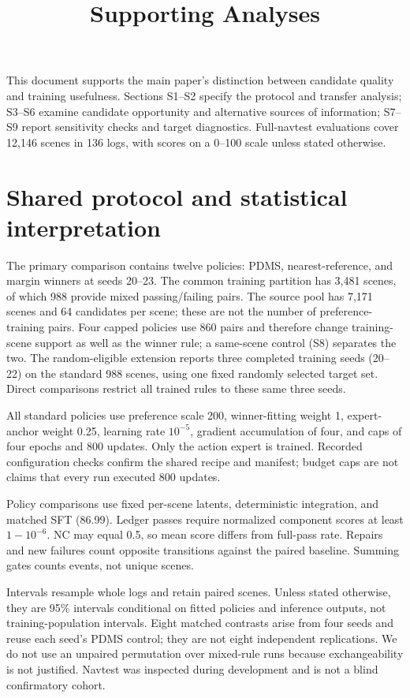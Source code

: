 \documentclass[10pt,letterpaper]{article}
\title{Supporting Analyses}
\date{}
\begin{document}
\maketitle
\noindent This document supports the main paper's distinction between candidate quality and training usefulness. Sections S1--S2 specify the protocol and transfer analysis; S3--S6 examine candidate opportunity and alternative sources of information; S7--S9 report sensitivity checks and target diagnostics. Full-navtest evaluations cover 12,146 scenes in 136 logs, with scores on a 0--100 scale unless stated otherwise. 

\FloatBarrier
\section{Shared protocol and statistical interpretation}
The primary comparison contains twelve policies: PDMS, nearest-reference, and margin winners at seeds 20--23. The common training partition has 3,481 scenes, of which 988 provide mixed passing/failing pairs. The source pool has 7,171 scenes and 64 candidates per scene; these are not the number of preference-training pairs. Four capped policies use 860 pairs and therefore change training-scene support as well as the winner rule; a same-scene control (S8) separates the two. The random-eligible extension reports three completed training seeds (20--22) on the standard 988 scenes, using one fixed randomly selected target set. Direct comparisons restrict all trained rules to these same three seeds.

All standard policies use preference scale 200, winner-fitting weight 1, expert-anchor weight 0.25, learning rate $10^{-5}$, gradient accumulation of four, and caps of four epochs and 800 updates. Only the action expert is trained. Recorded configuration checks confirm the shared recipe and manifest; budget caps are not claims that every run executed 800 updates.

Policy comparisons use fixed per-scene latents, deterministic integration, and matched SFT (86.99). Ledger passes require normalized component scores at least $1-10^{-6}$. NC may equal 0.5, so mean score differs from full-pass rate. Repairs and new failures count opposite transitions against the paired baseline. Summing gates counts events, not unique scenes.

Intervals resample whole logs and retain paired scenes. Unless stated otherwise, they are 95\% intervals conditional on fitted policies and inference outputs, not training-population intervals. Eight matched contrasts arise from four seeds and reuse each seed's PDMS control; they are not eight independent replications. We do not use an unpaired permutation over mixed-rule runs because exchangeability is not justified. Navtest was inspected during development and is not a blind confirmatory cohort.
\end{document}
